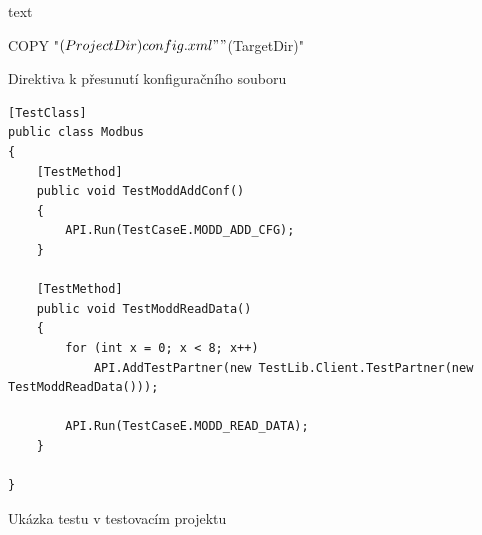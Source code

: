 \begin{listing}[p]
    \centering
    \begin{cminted}[breaklines,stripnl=false]{text}

COPY "$(ProjectDir)config.xml"  "$(TargetDir)"

    \end{cminted}
\caption{Direktiva k přesunutí konfiguračního souboru}
\label{listing:postbuild}
\end{listing}

\begin{listing}[p]
    \centering
    \begin{verbatim}
[TestClass]
public class Modbus
{
    [TestMethod]
    public void TestModdAddConf()
    {
        API.Run(TestCaseE.MODD_ADD_CFG);
    }
    
    [TestMethod]
    public void TestModdReadData()
    {
        for (int x = 0; x < 8; x++)
            API.AddTestPartner(new TestLib.Client.TestPartner(new TestModdReadData()));
    
        API.Run(TestCaseE.MODD_READ_DATA);
    }
    
}
    \end{verbatim}
\caption{Ukázka testu v testovacím projektu}
\label{listing:testcase_service}
\end{listing}



